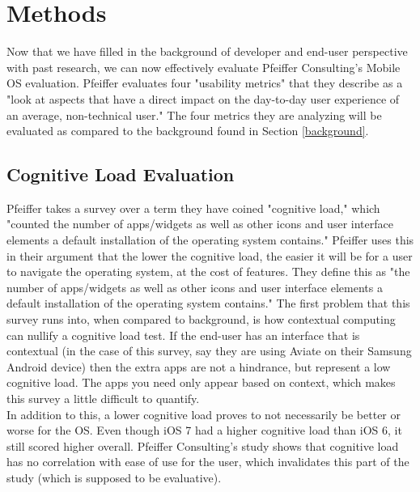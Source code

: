 \documentclass[11pt]{article}
\begin{document}
\section{Methods}
Now that we have filled in the background of developer and end-user perspective with past research, we can now effectively evaluate Pfeiffer Consulting's Mobile OS evaluation. Pfeiffer evaluates four "usability metrics" that they describe as a "look at aspects that have a direct impact on the day-to-day user experience of an average, non-technical user." \cite{Pfeiffer} The four metrics they are analyzing will be evaluated as compared to the background found in Section \ref{background}.
\subsection{Cognitive Load Evaluation}
Pfeiffer takes a survey over a term they have coined "cognitive load," which "counted
the number of apps/widgets as well as other icons and user interface elements a default installation of the operating system contains." \cite{Pfeiffer} Pfeiffer uses this in their argument that the lower the cognitive load, the easier it will be for a user to navigate the operating system, at the cost of features. They define this as "the number of apps/widgets as well as other icons and user interface elements a default installation of the operating system contains." \cite{Pfeiffer} The first problem that this survey runs into, when compared to background, is how contextual computing can nullify a cognitive load test. If the end-user has an interface that is contextual (in the case of this survey, say they are using Aviate on their Samsung Android device) then the extra apps are not a hindrance, but represent a low cognitive load. The apps you need only appear based on context, which makes this survey a little difficult to quantify. \\
\indent In addition to this, a lower cognitive load proves to not necessarily be better or worse for the OS. Even though iOS 7 had a higher cognitive load than iOS 6, it still scored higher overall. Pfeiffer Consulting's study shows that cognitive load has no correlation with ease of use for the user, which invalidates this part of the study (which is supposed to be evaluative).
\end{document}
